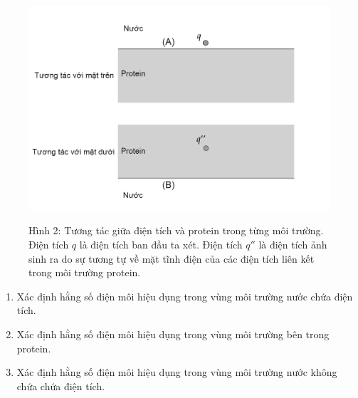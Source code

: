 \begin{enumerate}
    \begin{center}
    \begin{figure}[htp]
    \begin{center}
        \includegraphics[scale=.27
        ]{Problem_13/image/2.png}
    \end{center}
    \begin{center}
    Hình 2: Tương tác giữa điện tích và protein trong từng môi trường. Điện tích $q$ là điện tích ban đầu ta xét. Điện tích $q''$ là điện tích ảnh sinh ra do sự tương tự về mặt tĩnh điện của các điện tích liên kết trong môi trường protein.
    \end{center}
    \end{figure}
\end{center}

     \begin{enumerate}[label=\textbf{\alph*,}]\itemsep0em
        \item Xác định hằng số điện môi hiệu dụng trong vùng môi trường nước chứa điện tích.
        \item Xác định hằng số điện môi hiệu dụng trong vùng môi trường bên trong protein.
        \item Xác định hằng số điện môi hiệu dụng trong vùng môi trường nước không chứa chứa điện tích.
    \end{enumerate}


\end{enumerate}
